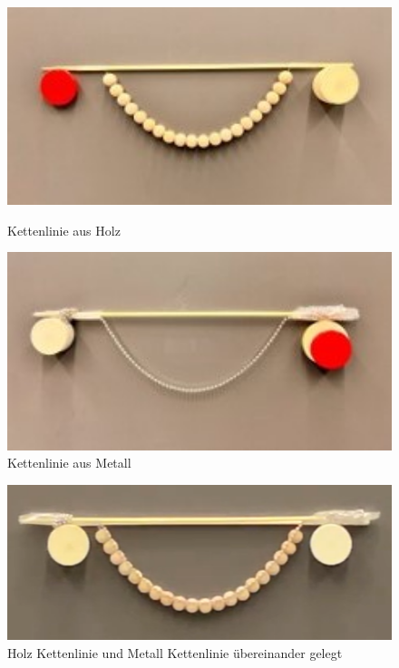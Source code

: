 \begin{figure}
	\centering
	\begin{minipage}{0.5\textwidth}
		\centering
		\includegraphics[width=1\textwidth]{papers/kettenlinie/images/kettenlinie_holz.jpg}
		\caption{Kettenlinie aus Holz}
		\label{fig:Kettenlinie-Holz}
	\end{minipage}\hfill
	\begin{minipage}{0.5\textwidth}
		\centering
		\includegraphics[width=1\textwidth]{papers/kettenlinie/images/kettenlinie_metall.jpg}
		\caption{Kettenlinie aus Metall}
		\label{fig:Kettenlinie-Metall}
	\end{minipage}
\end{figure}
\begin{figure}
	\centering
	\includegraphics[width=1\textwidth]{papers/kettenlinie/images/kettenlinie_holz_metall.png}
	\caption{Holz Kettenlinie und Metall Kettenlinie übereinander gelegt}
	\label{fig:Kettenlinie-Holz-Metall}
\end{figure}

